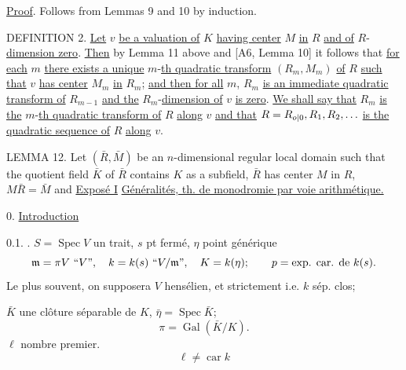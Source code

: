 \uline{Proof}. Follows from Lemmas 9 and 10 by induction.

DEFINITION 2. \uline{Let} $v$ \uline{be a valuation of} $K$ \uline{having center} $M$ \uline{in} $R$ \uline{and of} $R$-\uline{dimension zero}. \uline{Then} by Lemma 11 above and [A6, Lemma 10] it follows that \uline{for each} $m$ \uline{there exists a unique} $m$-\uline{th quadratic transform} $(R_m,M_m)$ \uline{of} $R$ \uline{such that} $v$ \uline{has center} $M_m$ \uline{in} $R_m$; \uline{and then for all} $m$, $R_m$ \uline{is an immediate quadratic transform of} $R_{m-1}$ \uline{and the} $R_m$-\uline{dimension of} $v$ \uline{is zero}. \uline{We shall say that} $R_m$ \uline{is the} $m$-\uline{th quadratic transform of} $R$ \uline{along} $v$ \uline{and that} $R=R_{{o|0}},R_1,R_2,\ldots$ \uline{is the quadratic sequence of} $R$ \uline{along} $v$.

LEMMA 12. Let $(\bar R,\bar M)$ be an $n$-dimensional regular local domain such that the quotient field $\bar K$ of $\bar R$ contains $K$ as a subfield, $\bar R$ has center $M$ in $R$, $M\bar R=\bar M$ and
\uline{Exposé I}\qquad{}
\uline{Généralités,  th. de monodromie par voie arithmétique.}

0. \uline{Introduction}

0.1. \uline{}. $S=\operatorname{Spec}V$ un trait, $s$ pt fermé, $\eta$ point générique
\[
\mathfrak m=\pi V{\text{ ``}V\text{''}},\quad k=k(s){\text{ ``}V/\mathfrak m\text{''}},\quad K=k(\eta);\qquad p=\text{exp. car. de }k(s).
\]
Le plus souvent, on supposera $V$ hensélien, et  strictement  i.e. $k$ sép. clos;

 $\bar K$ une clôture séparable de $K$, $\bar\eta=\operatorname{Spec}\bar K$;
\[
\pi=\operatorname{Gal}(\bar K/K).
\]
$\ell$ nombre premier.   
\[
\ell\neq\operatorname{car}k
\]


